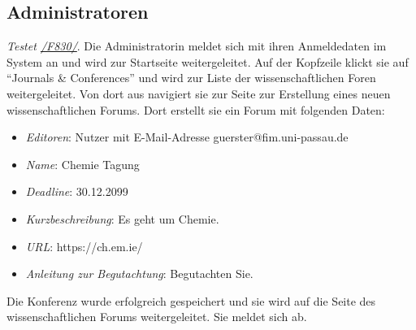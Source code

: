 \subsection{Administratoren}
\begin{description}

	 \emph{Testet \hyperref[funkt:830]{/F830/}}.
	Die Administratorin meldet sich mit ihren Anmeldedaten im System an und wird zur Startseite weitergeleitet.
	Auf der Kopfzeile klickt sie auf ``Journals \& Conferences'' und wird zur Liste der wissenschaftlichen Foren weitergeleitet.
	Von dort aus navigiert sie zur Seite zur Erstellung eines neuen wissenschaftlichen Forums.
	Dort erstellt sie ein Forum mit folgenden Daten:
	\begin{itemize}
		\item \emph{Editoren}: Nutzer mit E-Mail-Adresse guerster@fim.uni-passau.de
		\item \emph{Name}: Chemie Tagung
		\item \emph{Deadline}: 30.12.2099
		\item \emph{Kurzbeschreibung}: Es geht um Chemie.
		\item \emph{URL}: https://ch.em.ie/
		\item \emph{Anleitung zur Begutachtung}: Begutachten Sie.
	\end{itemize}
	Die Konferenz wurde erfolgreich gespeichert und sie wird auf die Seite des wissenschaftlichen Forums weitergeleitet.
	Sie meldet sich ab.

\end{description}

